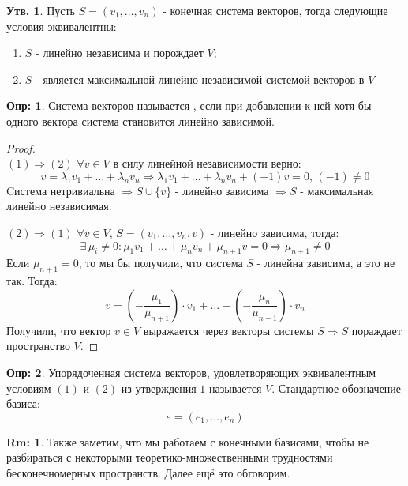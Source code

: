 \documentclass[12pt]{article}
\theoremstyle{definition}
\newtheorem{defn}{Опр:}
\newtheorem{rem}{Rm:}
\newtheorem{prop}{Утв.}
\begin{document}
\begin{prop}
	Пусть $S = (v_1,\dotsc, v_n)$ - конечная система векторов, тогда следующие условия эквивалентны:
	\begin{enumerate}[label=(\arabic*)]
		\item $S$ - линейно независима и порождает $V$;
		\item $S$ - является максимальной линейно независимой системой векторов в $V$
	\end{enumerate}
\end{prop}
\begin{defn}
	Система векторов называется , если при добавлении к ней хотя бы одного вектора система становится линейно зависимой.
\end{defn}
\begin{proof}
	\hfill\\
	$(1) \Rightarrow (2)$ $\forall v \in V$ в силу линейной независимости верно:
	$$
		v = \lambda_1 v_1 + \dotsc + \lambda_n v_n \Rightarrow \lambda_1 v_1 + 	\dotsc + \lambda_n v_n + (-1)v = 0, \, (-1) \neq 0
	$$ 
	Cистема нетривиальна $\Rightarrow S \cup \{v\}$ - линейно зависима $\Rightarrow S$ - максимальная линейно независимая.
	
	$(2) \Rightarrow (1)$ $\forall v \in V, \, S = (v_1,\dotsc,v_n, v)$ - линейно зависима, тогда:
	$$
		\exists \, \mu_i \neq 0 \colon \mu_1 v_1 + \dotsc + \mu_n v_n + \mu_{n+1} v = 0 \Rightarrow \mu_{n+1} \neq 0
	$$
	Если $\mu_{n+1} = 0$, то мы бы получили, что система $S$ - линейна зависима, а это не так. Тогда:
	$$
		v = \left(-\dfrac{\mu_1}{\mu_{n+1}}\right){\cdot}v_1  + \dotsc + \left(-\dfrac{\mu_n}{\mu_{n+1}}\right){\cdot}v_n	
	$$
	Получили, что вектор $v \in V$ выражается через векторы системы $S \Rightarrow S$ пораждает пространство $V$.
\end{proof}

\begin{defn}
	Упорядоченная система векторов, удовлетворяющих эквивалентным условиям $(1)$ и $(2)$ из утверждения $1$ называется  $V$. Стандартное обозначение базиса: 
	$$
		e = (e_1, \dotsc, e_n)
	$$
\end{defn}

\begin{rem}
	Также заметим, что мы работаем с конечными базисами, чтобы не разбираться с некоторыми теоретико-множественными трудностями бесконечномерных пространств. Далее ещё это обговорим.
\end{rem}
\end{document}
